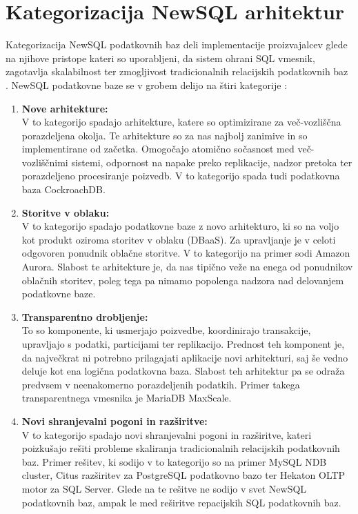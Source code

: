 \documentclass[a4paper, 12pt]{book}
\begin{document}
\section{Kategorizacija NewSQL arhitektur}
Kategorizacija NewSQL podatkovnih baz deli implementacije proizvajalcev glede na njihove pristope kateri so uporabljeni, da sistem ohrani SQL vmesnik, zagotavlja skalabilnost ter zmogljivost tradicionalnih relacijskih podatkovnih baz \cite{NewSQLNewWayToHandleBigData}. NewSQL podatkovne baze se v grobem delijo na štiri kategorije \cite{Mikuletic2015Feb, Pavlo2016Sep}:

\begin{enumerate}
    \item \textbf{Nove arhitekture:}\\V to kategorijo spadajo arhitekture, katere so optimizirane za več-vozliščna porazdeljena okolja. Te arhitekture so za nas najbolj zanimive in so implementirane od začetka. Omogočajo atomično sočasnost med več-vozliščnimi sistemi, odpornost na napake preko replikacije, nadzor pretoka ter porazdeljeno procesiranje poizvedb. V to kategorijo spada tudi podatkovna baza CockroachDB.
    \item \textbf{Storitve v oblaku:}\\V to kategorijo spadajo podatkovne baze z novo arhitekturo, ki so na voljo kot produkt oziroma storitev v oblaku (DBaaS). Za upravljanje je v celoti odgovoren ponudnik oblačne storitve. V to kategorijo na primer sodi Amazon Aurora. Slabost te arhitekture je, da nas tipično veže na enega od ponudnikov oblačnih storitev, poleg tega pa nimamo popolenga nadzora nad delovanjem podatkovne baze.
    \item \textbf{Transparentno drobljenje:}\\To so komponente, ki usmerjajo poizvedbe, koordinirajo transakcije, upravljajo s podatki, particijami ter replikacijo. Prednost teh komponent je, da največkrat ni potrebno prilagajati aplikacije novi arhitekturi, saj še vedno deluje kot ena logična podatkovna baza. Slabost teh arhitektur pa se odraža predvsem v neenakomerno porazdeljenih podatkih. Primer takega transparentnega vmesnika je MariaDB MaxScale.
    \item \textbf{Novi shranjevalni pogoni in razširitve:}\\V to kategorijo spadajo novi shranjevalni pogoni in razširitve, kateri poizkušajo rešiti probleme skaliranja tradicionalnih relacijskih podatkovnih baz. \cite{Kumar2018Jun} Primer rešitev, ki sodijo v to kategorijo so na primer MySQL NDB cluster, Citus razširitev za PostgreSQL podatkovno bazo ter Hekaton OLTP motor za SQL Server. Glede na \cite{Pavlo2016Sep} te rešitve ne sodijo v svet NewSQL podatkovnih baz, ampak le med reširitve repacijskih SQL podatkovnih baz.
\end{enumerate}
\end{document}
